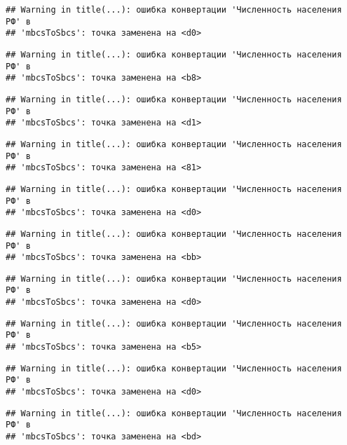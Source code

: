 \documentclass[
]{article}
\begin{document}
\begin{verbatim}
## Warning in title(...): ошибка конвертации 'Численность населения РФ' в
## 'mbcsToSbcs': точка заменена на <d0>
\end{verbatim}

\begin{verbatim}
## Warning in title(...): ошибка конвертации 'Численность населения РФ' в
## 'mbcsToSbcs': точка заменена на <b8>
\end{verbatim}

\begin{verbatim}
## Warning in title(...): ошибка конвертации 'Численность населения РФ' в
## 'mbcsToSbcs': точка заменена на <d1>
\end{verbatim}

\begin{verbatim}
## Warning in title(...): ошибка конвертации 'Численность населения РФ' в
## 'mbcsToSbcs': точка заменена на <81>
\end{verbatim}

\begin{verbatim}
## Warning in title(...): ошибка конвертации 'Численность населения РФ' в
## 'mbcsToSbcs': точка заменена на <d0>
\end{verbatim}

\begin{verbatim}
## Warning in title(...): ошибка конвертации 'Численность населения РФ' в
## 'mbcsToSbcs': точка заменена на <bb>
\end{verbatim}

\begin{verbatim}
## Warning in title(...): ошибка конвертации 'Численность населения РФ' в
## 'mbcsToSbcs': точка заменена на <d0>
\end{verbatim}

\begin{verbatim}
## Warning in title(...): ошибка конвертации 'Численность населения РФ' в
## 'mbcsToSbcs': точка заменена на <b5>
\end{verbatim}

\begin{verbatim}
## Warning in title(...): ошибка конвертации 'Численность населения РФ' в
## 'mbcsToSbcs': точка заменена на <d0>
\end{verbatim}

\begin{verbatim}
## Warning in title(...): ошибка конвертации 'Численность населения РФ' в
## 'mbcsToSbcs': точка заменена на <bd>
\end{verbatim}
\end{document}
